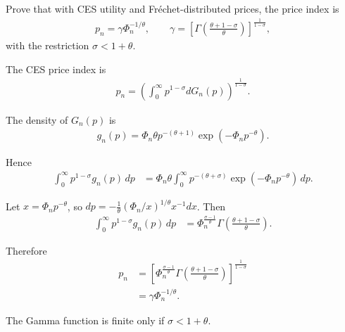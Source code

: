 
Prove that with CES utility and Fréchet-distributed prices, the price index is
\begin{align*}
p_n = \gamma \Phi_n^{-1/\theta}, \qquad 
\gamma = \left[\Gamma\!\left(\frac{\theta+1-\sigma}{\theta}\right)\right]^{\frac{1}{1-\sigma}},
\end{align*}
with the restriction $\sigma < 1+\theta$.

\begin{solution}
The CES price index is
\begin{align*}
p_n = \left( \int_0^\infty p^{1-\sigma} dG_n(p) \right)^{\tfrac{1}{1-\sigma}}.
\end{align*}

The density of $G_n(p)$ is
\begin{align*}
g_n(p) = \Phi_n \theta p^{-(\theta+1)} \exp(-\Phi_n p^{-\theta}).
\end{align*}

Hence
\begin{align*}
\int_0^\infty p^{1-\sigma} g_n(p)\, dp
&= \Phi_n \theta \int_0^\infty p^{-(\theta+\sigma)} 
    \exp(-\Phi_n p^{-\theta})\, dp.
\end{align*}

Let $x = \Phi_n p^{-\theta}$, so $dp = -\tfrac{1}{\theta} (\Phi_n/x)^{1/\theta} x^{-1} dx$. Then
\begin{align*}
\int_0^\infty p^{1-\sigma} g_n(p)\, dp
&= \Phi_n^{\tfrac{\sigma-1}{\theta}} 
   \Gamma\!\left(\tfrac{\theta+1-\sigma}{\theta}\right).
\end{align*}

Therefore
\begin{align*}
p_n &= \left[\Phi_n^{\tfrac{\sigma-1}{\theta}} 
   \Gamma\!\left(\tfrac{\theta+1-\sigma}{\theta}\right)\right]^{\tfrac{1}{1-\sigma}} \\
&= \gamma \Phi_n^{-1/\theta}.
\end{align*}

The Gamma function is finite only if $\sigma < 1 + \theta$.
\end{solution}

